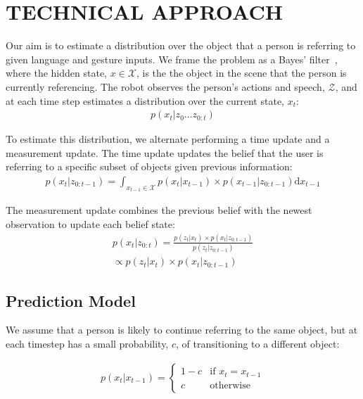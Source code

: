 \documentclass[letterpaper, 10 pt, conference]{ieeeconf}
\begin{document}
\section{TECHNICAL APPROACH}



Our aim is to estimate a distribution over the object that a person is
referring to given language and gesture inputs.  We frame the problem
as a Bayes' filter~\citep{thrun08}, where the hidden state,
$x \in \mathcal{X}$, is the the object in the scene that the person is
currently referencing. The robot observes the person's actions and
speech, $\mathcal{Z}$, and at each time step estimates a distribution
over the current state, $x_t$:
\begin{align}
  p(x_t | z_0 \dots z_{0:t})
\end{align}


To estimate this distribution, we alternate performing a time update
and a measurement update.  The time update updates the belief that the
user is referring to a specific subset of objects given previous
information:
\begin{align}
p(x_t | z_{0:t-1}) = \int_{x_{t-1} \in \mathcal{X}} p(x_t|x_{t-1})\times p(x_{t-1} | z_{0:t-1}) \text{d}x_{t-1}
\end{align}

The measurement update combines the previous belief with the newest observation to update each belief state: 
\begin{align}
p(x_t |z_{0:t}) = \frac{p(z_t | x_t) \times p(x_t | z_{0:t-1})}{p(z_t | z_{0:t-1})} \\\propto p(z_t | x_t) \times p(x_t | z_{0:t-1})
\end{align}



\subsection{Prediction Model}
We assume that a person is likely to continue referring to the same
object, but at each timestep has a small probability, $c$, of
transitioning to a different object: 

\begin{align}
p(x_t | x_{t-1}) = \left\{  \begin{array}{ll}
1-c &\mbox{if } x_t = x_{t-1}\\
c &\mbox{otherwise}
\end{array}\right.
\end{align}
\end{document}
